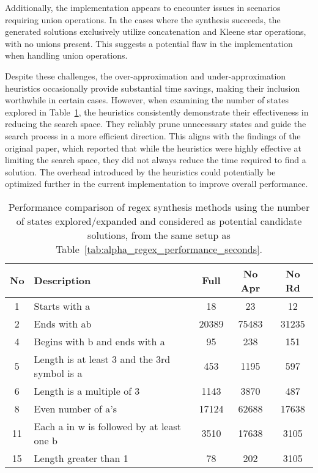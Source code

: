 \indent\indent Additionally, the implementation appears to encounter issues in scenarios requiring union operations. In the cases where the synthesis succeeds, the generated solutions exclusively utilize concatenation and Kleene star operations, with no unions present. This suggests a potential flaw in the implementation when handling union operations.

\indent\indent Despite these challenges, the over-approximation and under-approximation heuristics occasionally provide substantial time savings, making their inclusion worthwhile in certain cases. However, when examining the number of states explored in Table~\ref{tab:alpha_regex_performance_states}, the heuristics consistently demonstrate their effectiveness in reducing the search space. They reliably prune unnecessary states and guide the search process in a more efficient direction. This aligns with the findings of the original paper, which reported that while the heuristics were highly effective at limiting the search space, they did not always reduce the time required to find a solution. The overhead introduced by the heuristics could potentially be optimized further in the current implementation to improve overall performance.

\begin{table}[h!]
	\centering
	\caption{Performance comparison of regex synthesis methods using the number of states explored/expanded and considered as potential candidate solutions, from the same setup as Table~\ref{tab:alpha_regex_performance_seconds}.}
	\label{tab:alpha_regex_performance_states}
	\begin{tabular}{|c|p{5cm}|c|c|c|}
	\hline
	\textbf{No} & \textbf{Description} & \textbf{Full} & \textbf{No Apr} & \textbf{No Rd} \\
	\hline
	1 & Starts with a & 18 & 23 & 12 \\
	2 & Ends with ab & 20389 & 75483 & 31235 \\
	4 & Begins with b and ends with a & 95 & 238 & 151 \\
	5 & Length is at least 3 and the 3rd symbol is a & 453 & 1195 & 597 \\
	6 & Length is a multiple of 3 & 1143 & 3870 & 487 \\
	8 & Even number of a's & 17124 & 62688 & 17638 \\
	11 & Each a in w is followed by at least one b & 3510 & 17638 & 3105 \\
	15 & Length greater than 1 & 78 & 202 & 3105 \\
	\hline
\end{tabular}
\end{table}

